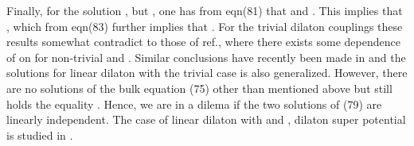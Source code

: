 \documentclass[a4paper,12pt]{article}
\begin{document}
Finally, for the solution 
\coordHE{}, but 
\coordHE{}, one has from eqn(81) that \coordHE{} and 
\coordHE{}. This implies that \coordHE{}, which from 
eqn(83) further implies that \coordHE{}. For the trivial dilaton couplings 
these results somewhat contradict to those of ref.\cite{KKL}, where there 
exists some dependence of \coordHE{} on \coordHE{} for 
non-trivial \myHighlight{$\alpha$}\coordHE{} and \coordHE{}. Similar conclusions have recently 
been made in \cite{NIC} and the solutions for linear dilaton with the 
trivial case \coordHE{} is also generalized. However, there are no solutions 
of the bulk equation (75) other than mentioned above but still holds 
the equality \coordHE{}. 
Hence, we are in a dilema if the two solutions of (79) are linearly 
independent. The case of linear dilaton with \coordHE{} and 
\coordHE{}, dilaton super potential is studied in 
\cite{ILZ}.
\end{document}
